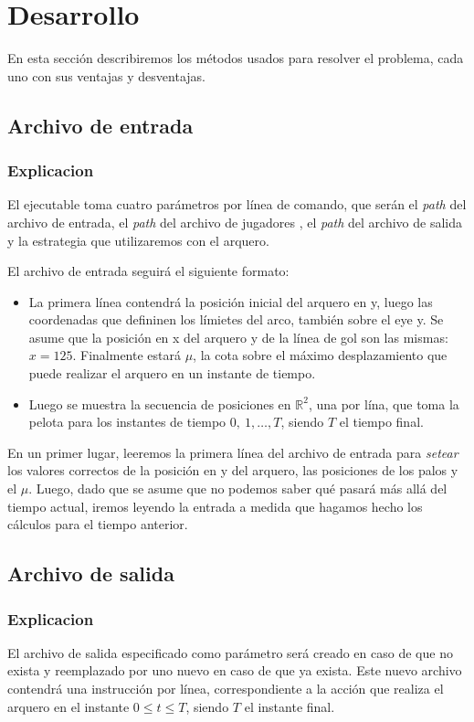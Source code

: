 \section{Desarrollo}
En esta sección describiremos los métodos usados para resolver el problema, cada uno con sus
ventajas y desventajas.

\subsection{Archivo de entrada}
\subsubsection{Explicacion}
El ejecutable toma cuatro parámetros por línea de comando, que serán el \textit{path} del archivo de entrada, el \textit{path} del archivo de jugadores , el \textit{path} del archivo de salida y la estrategia que utilizaremos con el arquero.

El archivo de entrada seguirá el siguiente formato:
\begin{itemize}
	\item La primera línea contendrá la posición inicial del arquero en y, luego las coordenadas que defininen los límietes del arco, también sobre el eye y. Se asume que la posición en x del arquero y de la línea de gol son las mismas: $x = 125$. Finalmente estará $\mu$, la cota sobre el máximo desplazamiento que puede realizar el arquero en un instante de tiempo.
	\item Luego se muestra la secuencia de posiciones en $\mathbb{R}^2$, una por lína, que toma la pelota para los instantes de tiempo $0, \ 1, \ldots, T$, siendo $T$ el tiempo final.
\end{itemize}

En un primer lugar, leeremos la primera línea del archivo de entrada para \textit{setear} los valores correctos de la posición en y del arquero, las posiciones de los palos y el $\mu$. Luego, dado que se asume que no podemos saber qué pasará más allá del tiempo actual, iremos leyendo la entrada a medida que hagamos hecho los cálculos para el tiempo anterior.

\subsection{Archivo de salida}
\subsubsection{Explicacion}
El archivo de salida especificado como parámetro será creado en caso de que no exista y reemplazado por uno nuevo en caso de que ya exista. Este nuevo archivo contendrá una instrucción por línea, correspondiente a la acción que realiza el arquero en el instante $0 \leq t \leq T$, siendo $T$ el instante final.

